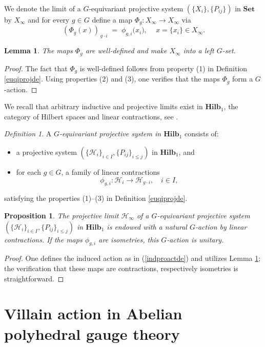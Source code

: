\documentclass[11pt,reqno]{amsart}
\numberwithin{equation}{section}
\newtheorem{lemma}[theorem]{Lemma}
\newtheorem{proposition}[theorem]{Proposition}
\theoremstyle{remark}
\theoremstyle{rmdefinition}
\newtheorem{definition}[theorem]{Definition}
\begin{document}
We denote the limit of a $G$-equivariant projective system $(\{X_i\},\{P_{ij}\})$ in $\mathbf{Set}$ by $X_\infty$ and for every $g \in G$ define a map $\Phi_g: X_\infty \to X_\infty$ via
 \begin{equation}\label{indproactde}
	\, (\Phi_g(x))_{\,g\cdot i}\;=\;\phi_{g,i}\big(x_i\big), \,\quad x=\{x_i\} \in X_\infty.
\end{equation}
\begin{lemma}\label{lemproact}
The maps $\Phi_g$ are well-defined and make $X_\infty$ into a left $G$-set.
\end{lemma} 
\begin{proof}
The fact that $\Phi_g$ is well-defined follows from property (1) in Definition \ref{euqiprojde}. Using properties (2) and (3), one verifies that  the maps $\Phi_g$ form a $G$-action.
\end{proof}
We recall that arbitrary inductive and projective limits exist in 
$\mathbf{Hilb}_1$, the category of Hilbert spaces and linear contractions, see \cite[Section 2]{Gr}.
\begin{definition}\label{euqiprohilb}
	A \emph{$G$-equivariant projective system in $\mathbf{Hilb}_1$} consists of:
	\begin{itemize}
		\item a projective system $(\{\mathcal{H}_{i}\}_{i\in I},\{P_{ij}\}_{i\le j})$ in $\mathbf{Hilb}_1$, and
		\item for each $g\in G$, a family of linear contractions
		\[
		\phi_{g,i}: \mathcal{H}_i \rightarrow \mathcal{H}_{g\cdot i},\quad i\in I,
		\]
	\end{itemize}
	satisfying the properties (1)--(3) in Definition \ref{euqiprojde}.
\end{definition}

\begin{proposition}\label{proponisomgievi}
The projective limit $\mathcal{H}_\infty$ of a $G$-equivariant projective system $(\{\mathcal{H}_{i}\}_{i\in I},\{P_{ij}\}_{i\le j})$ in $\mathbf{Hilb}_1$ is endowed with a natural $G$-action by linear contractions. If the maps $\phi_{g,i}$ are isometries, this $G$-action is unitary.
\end{proposition} 
\begin{proof}
One defines the induced action as in (\ref{indproactde}) and utilizes Lemma \ref{lemproact}; the verification that these maps are contractions, respectively isometries is straightforward.
\end{proof}


\section{Villain action in Abelian polyhedral gauge theory}\label{vactinpoly}
\end{document}
